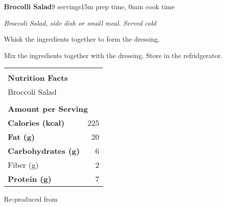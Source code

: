\documentclass[../recipe-collections/cooking.tex]{subfiles}
\begin{document}
\begin{recipe}{\textbf{Brocolli Salad}}{9 servings}{15m prep time, 0min cook time}
  
  \freeform{}\textit{Broccoli Salad, side dish or small meal. Served cold}


  Whisk the ingredients together to form the dressing.


  Mix the ingredients together with the dressing. 
  Store in the refridgerator.

  \bigskip
  \centering
  \begin{tabular}{|lr|}
    \hline
                                        &                                       \\
    \multicolumn{2}{|l|}{\huge{\textbf{\textrm{Nutrition Facts}}}}              \\
    \multicolumn{2}{|l|}{\textrm{Broccoli Salad}}                               \\ 
                                        &                                       \\
    \multicolumn{2}{|l|}{\footnotesize{\textbf{\textrm{Amount per Serving}}}}   \\ \hline
    \textbf{\textrm{Calories (kcal)}}   & \textrm{225}                          \\ \hline
    \textbf{\textrm{Fat (g)}}           & \textrm{20}                           \\ \hline
    \textbf{\textrm{Carbohydrates (g)}} & \textrm{6}                            \\ \hline
    \hspace{2mm} \textrm{Fiber (g)}     & \textrm{2}                            \\ \hline
    \textbf{\textrm{Protein (g)}}       & \textrm{7}                            \\ \hline
  \end{tabular}
  
  \freeform{}\hrulefill{}

\end{recipe}

Re-produced from  \autocite{ketoqueens_2021}
\end{document}

